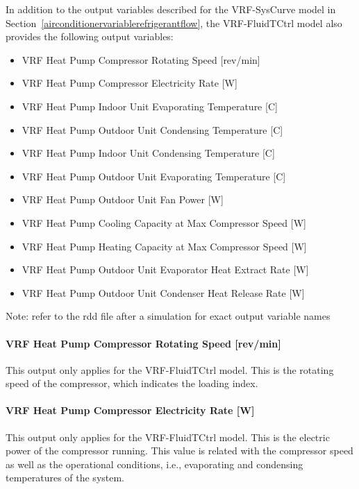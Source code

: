 In addition to the output variables described for the VRF-SysCurve model in Section~\ref{airconditionervariablerefrigerantflow}, the VRF-FluidTCtrl model also provides the following output variables:

\begin{itemize}
\item
  VRF Heat Pump Compressor Rotating Speed {[}rev/min{]}
\item
  VRF Heat Pump Compressor Electricity Rate {[}W{]}
\item
  VRF Heat Pump Indoor Unit Evaporating Temperature {[}C{]}
\item
  VRF Heat Pump Outdoor Unit Condensing Temperature {[}C{]}
\item
  VRF Heat Pump Indoor Unit Condensing Temperature {[}C{]}
\item
  VRF Heat Pump Outdoor Unit Evaporating Temperature {[}C{]}
\item
  VRF Heat Pump Outdoor Unit Fan Power {[}W{]}
\item
  VRF Heat Pump Cooling Capacity at Max Compressor Speed {[}W{]}
\item
  VRF Heat Pump Heating Capacity at Max Compressor Speed {[}W{]}
\item
  VRF Heat Pump Outdoor Unit Evaporator Heat Extract Rate {[}W{]}
\item
  VRF Heat Pump Outdoor Unit Condenser Heat Release Rate {[}W{]}
\end{itemize}

Note: refer to the rdd file after a simulation for exact output variable names

\paragraph{VRF Heat Pump Compressor Rotating Speed {[}rev/min{]}}\label{vrf-heat-pump-compressor-rotating-speed-revmin}

This output only applies for the VRF-FluidTCtrl model. This is the rotating speed of the compressor, which indicates the loading index.

\paragraph{VRF Heat Pump Compressor Electricity Rate {[}W{]}}\label{vrf-heat-pump-compressor-electric-power-at-cooling-mode-w}

This output only applies for the VRF-FluidTCtrl model. This is the electric power of the compressor running. This value is related with the compressor speed as well as the operational conditions, i.e., evaporating and condensing temperatures of the system.


